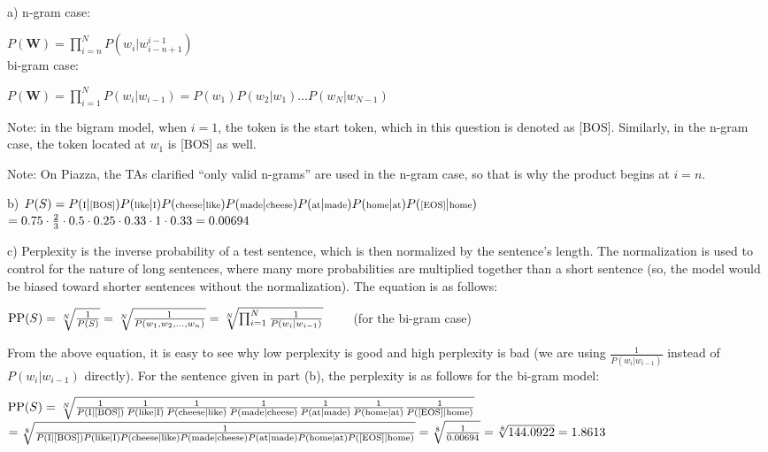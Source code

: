 \begin{solution} \ \\
	a) n-gram case:
	
	$P(\textbf{W}) = \prod_{i=n}^{N} P(w_i | w_{i-n+1}^{i-1})$\\
	
	bi-gram case:
	
	$P(\textbf{W}) = \prod_{i=1}^{N} P(w_i | w_{i-1}) = P(w_1)P(w_2 \vert w_1)...P(w_N \vert w_{N-1})$
	
	Note: in the bigram model, when $i = 1$, the token is the start token, which in this question is denoted as [BOS]. Similarly, in the n-gram case, the token located at $w_1$ is [BOS] as well.
	
	Note: On Piazza, the TAs clarified ``only valid n-grams'' are used in the n-gram case, so that is why the product begins at $i = n$.
	
	b) $\scriptsize P(S) = P(\text{I} \vert \text{[BOS]}) P(\text{like} \vert \text{I})P(\text{cheese} \vert \text{like}) P(\text{made} \vert \text{cheese}) P(\text{at} \vert \text{made}) P(\text{home} \vert \text{at}) P(\text{[EOS]} \vert \text{home})$\\
	$= 0.75 \cdot \frac{2}{3} \cdot 0.5 \cdot 0.25 \cdot 0.33 \cdot 1 \cdot 0.33\\
	= 0.00694$
	
	c) Perplexity is the inverse probability of a test sentence, which is then normalized by the sentence's length. The normalization is used to control for the nature of long sentences, where many more probabilities are multiplied together than a short sentence (so, the model would be biased toward shorter sentences without the normalization). The equation is as follows:
	
	$\text{PP}(S) = \sqrt[N]{\frac{1}{P(S)}} = \sqrt[N]{\frac{1}{P(w_1, w_2, \dots, w_n)}}\\
	= \sqrt[N]{\prod_{i=1}^{N}\frac{1}{P(w_i \vert w_{i-1})}} \qquad$ (for the bi-gram case)
	
	From the above equation, it is easy to see why low perplexity is good and high perplexity is bad (we are using $\frac{1}{P(w_i \vert w_{i-1})}$ instead of $P(w_i \vert w_{i-1})$ directly). For the sentence given in part (b), the perplexity is as follows for the bi-gram model:
	
	$\text{PP}(S) = \sqrt[N]{\frac{1}{P(\text{I} \vert \text{[BOS]})}\frac{1}{P(\text{like} \vert \text{I})}\frac{1}{P(\text{cheese} \vert \text{like})}\frac{1}{P(\text{made} \vert \text{cheese})}\frac{1}{P(\text{at} \vert \text{made})}\frac{1}{P(\text{home} \vert \text{at})}\frac{1}{P(\text{[EOS]} \vert \text{home})}}\\$
	$= \sqrt[8]{\frac{1}{P(\text{I} \vert \text{[BOS]}) P(\text{like} \vert \text{I})P(\text{cheese} \vert \text{like}) P(\text{made} \vert \text{cheese}) P(\text{at} \vert \text{made}) P(\text{home} \vert \text{at}) P(\text{[EOS]} \vert \text{home})}}\\
	= \sqrt[8]{\frac{1}{0.00694}}\\
	= \sqrt[8]{144.0922}\\
	= 1.8613$\\


\end{solution}

